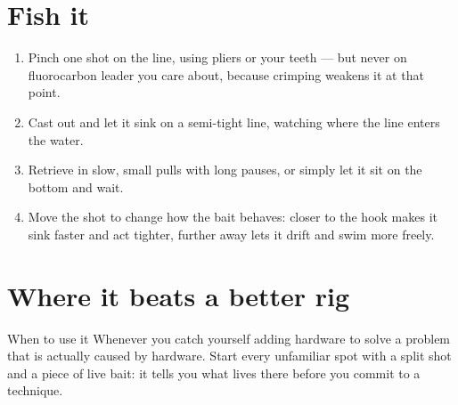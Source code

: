 \section{Fish it}
\begin{enumerate}
\item Pinch one shot on the line, using pliers or your teeth --- but never on fluorocarbon leader you care about, because crimping weakens it at that point.
\item Cast out and let it sink on a semi-tight line, watching where the line enters the water.
\item Retrieve in slow, small pulls with long pauses, or simply let it sit on the bottom and wait.
\item Move the shot to change how the bait behaves: closer to the hook makes it sink faster and act tighter, further away lets it drift and swim more freely.
\end{enumerate}

\section{Where it beats a better rig}
\begin{telosfacts}[0.20]
\end{telosfacts}

\begin{telospanel}{When to use it}
Whenever you catch yourself adding hardware to solve a problem that is actually caused by hardware. Start every unfamiliar spot with a split shot and a piece of live bait: it tells you what lives there before you commit to a technique.
\end{telospanel}

